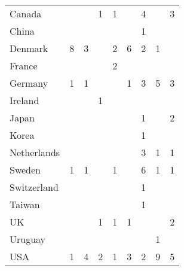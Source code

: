 \begin{table}[ht]
\begin{tabular}{lp{.07\linewidth}p{.07\linewidth}p{.09\linewidth}p{.09\linewidth}p{.07\linewidth}p{.08\linewidth}p{.1\linewidth}p{.07\linewidth}}
  \hspace{2mm}Canada &  &  & 1 & 1 &  & 4 &  & 3 \\ 
  \hspace{2mm}China &  &  &  &  &  & 1 &  &  \\ 
  \hspace{2mm}Denmark & 8 & 3 &  & 2 & 6 & 2 & 1 &  \\ 
  \hspace{2mm}France &  &  &  & 2 &  &  &  &  \\ 
  \hspace{2mm}Germany & 1 & 1 &  &  & 1 & 3 & 5 & 3 \\ 
  \hspace{2mm}Ireland &  &  & 1 &  &  &  &  &  \\ 
  \hspace{2mm}Japan &  &  &  &  &  & 1 &  & 2 \\ 
  \hspace{2mm}Korea &  &  &  &  &  & 1 &  &  \\ 
  \hspace{2mm}Netherlands &  &  &  &  &  & 3 & 1 & 1 \\ 
  \hspace{2mm}Sweden & 1 & 1 &  & 1 &  & 6 & 1 & 1 \\ 
  \hspace{2mm}Switzerland &  &  &  &  &  & 1 &  &  \\ 
  \hspace{2mm}Taiwan &  &  &  &  &  & 1 &  &  \\ 
  \hspace{2mm}UK &  &  & 1 & 1 & 1 &  &  & 2 \\ 
  \hspace{2mm}Uruguay &  &  &  &  &  &  & 1 &  \\ 
  \hspace{2mm}USA & 1 & 4 & 2 & 1 & 3 & 2 & 9 & 5 \\ 
   \hline
\end{tabular}
\endgroup
\end{table}

